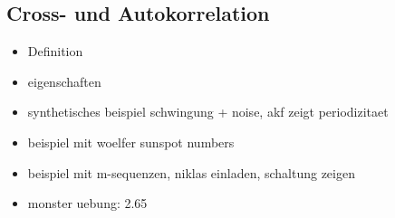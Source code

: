 \subsection{Cross- und Autokorrelation}\label{corr}

\begin{itemize}
    \item Definition
    \item eigenschaften
    \item synthetisches beispiel schwingung + noise, akf zeigt periodizitaet
    \item beispiel mit woelfer sunspot numbers
    \item beispiel mit m-sequenzen, niklas einladen, schaltung zeigen
    \item monster uebung: 2.65
\end{itemize}